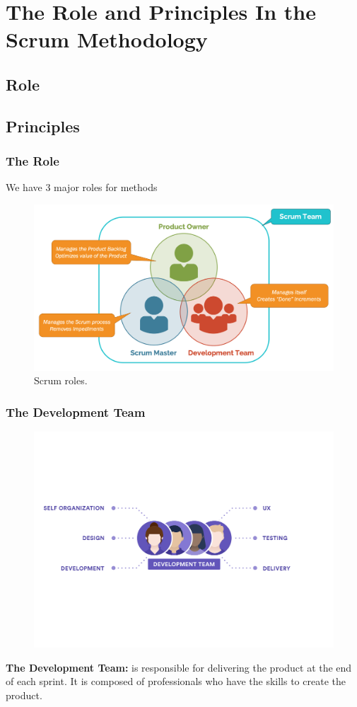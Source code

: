 \documentclass[
	11pt, %
]{beamer}
\begin{document}

\section{The Role and Principles In the Scrum Methodology}
\subsection{Role}
\subsection{Principles}

\begin{frame}
	\frametitle{The Role}
	We have 3 major roles for methods 
	\begin{figure}
		\includegraphics[width=0.8\linewidth]{Role.png}
		\caption{Scrum roles.}
	\end{figure}
\end{frame}

\begin{frame}
	\frametitle{The Development Team}
	\begin{figure}
		\centering
		\includegraphics[width=0.7\linewidth]{Scrum-Development Team-revised.png}
	\end{figure}
	\tiny
	\textbf{The Development Team:} is responsible for delivering the product at the end of each sprint. It is composed of professionals who have the skills to create the product.
\end{frame}
\end{document}
